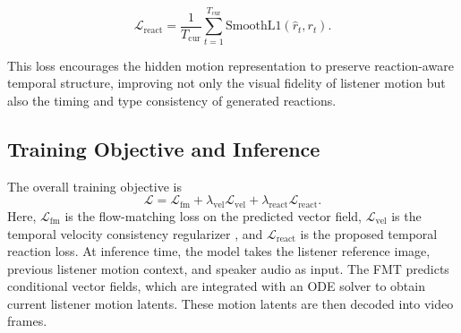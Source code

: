 \vspace{-1em}
{
\footnotesize
\begin{equation}
    \mathcal{L}_{\text{react}}=
    \frac{1}{T_{\text{cur}}}
    \sum_{t=1}^{T_{\text{cur}}}
    \mathrm{SmoothL1}(\hat{r}_t,r_t).
\end{equation}
}
\vspace{-1em}

This loss encourages the hidden motion representation to preserve reaction-aware temporal structure, improving not only the visual fidelity of listener motion but also the timing and type consistency of generated reactions.

\subsection{Training Objective and Inference}

The overall training objective is
{
\small
\begin{equation}
    \mathcal{L}=
    \mathcal{L}_{\text{fm}}
    +\lambda_{\text{vel}}\mathcal{L}_{\text{vel}}
    +\lambda_{\text{react}}\mathcal{L}_{\text{react}}.
\end{equation}
}Here, $\mathcal{L}_{\text{fm}}$ is the flow-matching loss on the predicted vector field, $\mathcal{L}_{\text{vel}}$ is the temporal velocity consistency regularizer \cite{ki2025float}, and $\mathcal{L}_{\text{react}}$ is the proposed temporal reaction loss. At inference time, the model takes the listener reference image, previous listener motion context, and speaker audio as input. The FMT predicts conditional vector fields, which are integrated with an ODE solver to obtain current listener motion latents. These motion latents are then decoded into video frames. 
